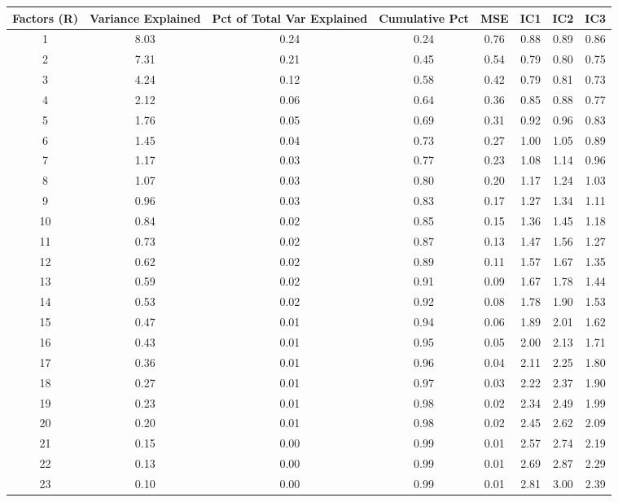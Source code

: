 \documentclass[11pt, letterpaper]{article}\usepackage[]{graphicx}\usepackage[]{color}
\begin{document}
\begin{table}[H]
\centering
\begingroup\scriptsize
\begin{tabular}{cccccccc}
  \hline
Factors (R) & Variance Explained & Pct of Total Var Explained & Cumulative Pct & MSE & IC1 & IC2 & IC3 \\ 
  \hline
  1 & 8.03 & 0.24 & 0.24 & 0.76 & 0.88 & 0.89 & 0.86 \\ 
    2 & 7.31 & 0.21 & 0.45 & 0.54 & 0.79 & 0.80 & 0.75 \\ 
    3 & 4.24 & 0.12 & 0.58 & 0.42 & 0.79 & 0.81 & 0.73 \\ 
    4 & 2.12 & 0.06 & 0.64 & 0.36 & 0.85 & 0.88 & 0.77 \\ 
    5 & 1.76 & 0.05 & 0.69 & 0.31 & 0.92 & 0.96 & 0.83 \\ 
    6 & 1.45 & 0.04 & 0.73 & 0.27 & 1.00 & 1.05 & 0.89 \\ 
    7 & 1.17 & 0.03 & 0.77 & 0.23 & 1.08 & 1.14 & 0.96 \\ 
    8 & 1.07 & 0.03 & 0.80 & 0.20 & 1.17 & 1.24 & 1.03 \\ 
    9 & 0.96 & 0.03 & 0.83 & 0.17 & 1.27 & 1.34 & 1.11 \\ 
   10 & 0.84 & 0.02 & 0.85 & 0.15 & 1.36 & 1.45 & 1.18 \\ 
   11 & 0.73 & 0.02 & 0.87 & 0.13 & 1.47 & 1.56 & 1.27 \\ 
   12 & 0.62 & 0.02 & 0.89 & 0.11 & 1.57 & 1.67 & 1.35 \\ 
   13 & 0.59 & 0.02 & 0.91 & 0.09 & 1.67 & 1.78 & 1.44 \\ 
   14 & 0.53 & 0.02 & 0.92 & 0.08 & 1.78 & 1.90 & 1.53 \\ 
   15 & 0.47 & 0.01 & 0.94 & 0.06 & 1.89 & 2.01 & 1.62 \\ 
   16 & 0.43 & 0.01 & 0.95 & 0.05 & 2.00 & 2.13 & 1.71 \\ 
   17 & 0.36 & 0.01 & 0.96 & 0.04 & 2.11 & 2.25 & 1.80 \\ 
   18 & 0.27 & 0.01 & 0.97 & 0.03 & 2.22 & 2.37 & 1.90 \\ 
   19 & 0.23 & 0.01 & 0.98 & 0.02 & 2.34 & 2.49 & 1.99 \\ 
   20 & 0.20 & 0.01 & 0.98 & 0.02 & 2.45 & 2.62 & 2.09 \\ 
   21 & 0.15 & 0.00 & 0.99 & 0.01 & 2.57 & 2.74 & 2.19 \\ 
   22 & 0.13 & 0.00 & 0.99 & 0.01 & 2.69 & 2.87 & 2.29 \\ 
   23 & 0.10 & 0.00 & 0.99 & 0.01 & 2.81 & 3.00 & 2.39 \\ 

\end{tabular}
\end{table}
\end{document}
